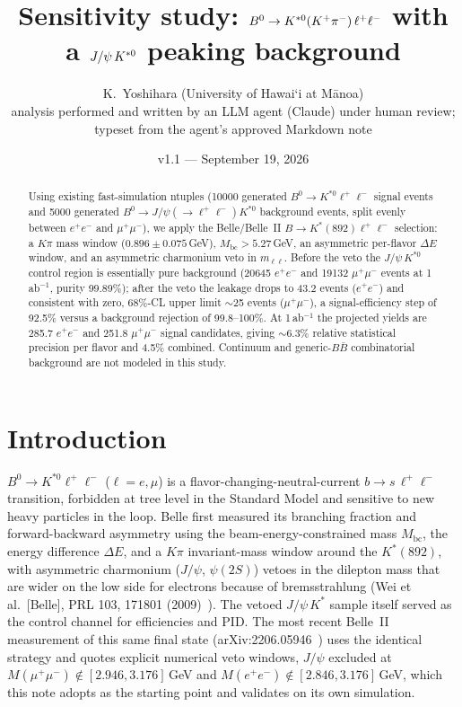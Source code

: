 \documentclass[11pt]{article}
\title{Sensitivity study: $B^0 \to \Kst(K^{+}\pi^{-})\,\ell^{+}\ell^{-}$
  with a $\jpsi\,\Kst$ peaking background}
\author{K.~Yoshihara (University of Hawai\textquoteleft i at M\=anoa)\\[2pt]
  \small analysis performed and written by an LLM agent (Claude) under
  human review;\\ \small typeset from the agent's approved Markdown note}
\date{v1.1 --- September 19, 2026}
\newcommand{\Kst}{K^{*0}}
\newcommand{\Mbc}{M_{\mathrm{bc}}}
\newcommand{\dE}{\Delta E}
\newcommand{\mll}{m_{\ell\ell}}
\newcommand{\jpsi}{J/\psi}
\begin{document}
\maketitle

\begin{center}
\end{center}

\begin{abstract}
Using existing fast-simulation ntuples (10000 generated
$B^0\to\Kst\ell^{+}\ell^{-}$ signal events and 5000 generated
$B^0\to\jpsi(\to\ell^{+}\ell^{-})\Kst$ background events, split evenly
between $e^+e^-$ and $\mu^+\mu^-$), we apply the Belle/Belle~II
$B\to K^{*}(892)\ell^{+}\ell^{-}$ selection: a $K\pi$ mass window
($0.896 \pm 0.075$\,GeV), $\Mbc > 5.27$\,GeV, an asymmetric per-flavor
$\dE$ window, and an asymmetric charmonium veto in $\mll$. Before the
veto the $\jpsi\,\Kst$ control region is essentially pure background
(20645 $e^+e^-$ and 19132 $\mu^+\mu^-$ events at 1\,ab$^{-1}$, purity
99.89\%); after the veto the leakage drops to 43.2 events ($e^+e^-$) and
consistent with zero, 68\%-CL upper limit $\sim$25 events
($\mu^+\mu^-$), a signal-efficiency step of 92.5\% versus a background
rejection of 99.8--100\%. At 1\,ab$^{-1}$ the projected yields are 285.7
$e^+e^-$ and 251.8 $\mu^+\mu^-$ signal candidates, giving $\sim$6.3\%
relative statistical precision per flavor and 4.5\% combined. Continuum
and generic-$B\bar B$ combinatorial background are not modeled in this
study.
\end{abstract}

\tableofcontents

\section{Introduction}

$B^0\to\Kst\ell^{+}\ell^{-}$ ($\ell = e,\mu$) is a
flavor-changing-neutral-current $b\to s\,\ell^{+}\ell^{-}$ transition,
forbidden at tree level in the Standard Model and sensitive to new heavy
particles in the loop. Belle first measured its branching fraction and
forward-backward asymmetry using the beam-energy-constrained mass
$\Mbc$, the energy difference $\dE$, and a $K\pi$ invariant-mass window
around the $K^{*}(892)$, with asymmetric charmonium ($\jpsi$,
$\psi(2S)$) vetoes in the dilepton mass that are wider on the low side
for electrons because of bremsstrahlung (Wei et al.\ [Belle], PRL 103,
171801 (2009)~\cite{Wei:2009}). The vetoed $\jpsi\,K^{*}$ sample itself
served as the control channel for efficiencies and PID. The most recent
Belle~II measurement of this same final state
(arXiv:2206.05946~\cite{BelleII:2206}) uses the
identical strategy and quotes explicit numerical veto windows, $\jpsi$
excluded at $M(\mu^+\mu^-) \notin [2.946, 3.176]$\,GeV and
$M(e^+e^-) \notin [2.846, 3.176]$\,GeV, which this note adopts as the
starting point and validates on its own simulation.
\end{document}
